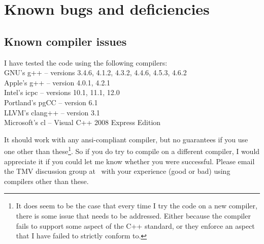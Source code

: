 
\section{Known bugs and deficiencies}
\label{Bugs}

\subsection{Known compiler issues}
\label{Install_Issues}

I have tested the code using the following compilers:\\
$\quad$\\
% 
GNU's g++ -- versions 3.4.6, 4.1.2, 4.3.2, 4.4.6, 4.5.3, 4.6.2 \\
Apple's g++ -- version 4.0.1, 4.2.1 \\
Intel's icpc -- versions 10.1, 11.1, 12.0\\
Portland's pgCC -- version 6.1\\
LLVM's clang++ -- version 3.1\\
Microsoft's cl -- Visual C++ 2008 Express Edition\\

It should work with any ansi-compliant
compiler, but no guarantees if you use one other than these\footnote{
It does seem to be the case that 
every time I try the code on a new compiler, there is some issue that needs to be addressed.  
Either because the compiler fails to support some aspect of the C++ standard, or they enforce
an aspect that I have failed to strictly conform to.}.
  So if you do try to compile on a different compiler, 
I would appreciate it if you could let me know whether you were successful.  
Please email the TMV discussion group at \mygroup\ with your experience (good or bad) using 
compilers other than these.

